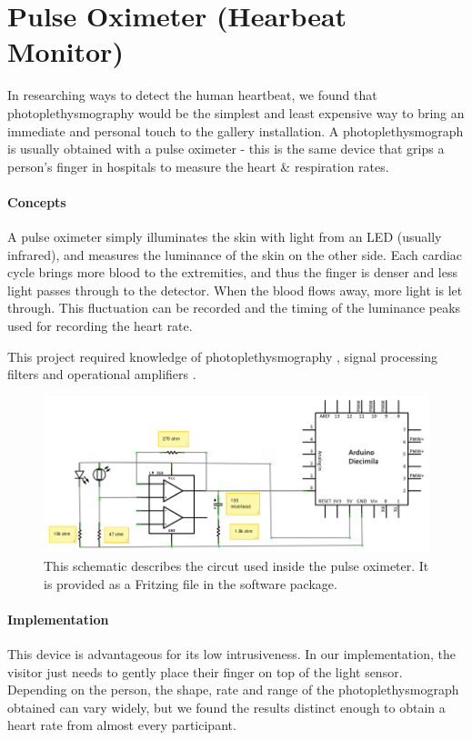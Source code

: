 \section{Pulse Oximeter (Hearbeat Monitor)}
In researching ways to detect the human heartbeat, we found that photoplethysmography would be the simplest and least expensive way to bring an immediate and personal touch to the gallery installation. A photoplethysmograph is usually obtained with a pulse oximeter - this is the same device that grips a person's finger in hospitals to measure the heart \& respiration rates. 

\paragraph{Concepts}
A pulse oximeter simply illuminates the skin with light from an LED (usually infrared), and measures the luminance of the skin on the other side. Each cardiac cycle brings more blood to the extremities, and thus the finger is denser and less light passes through to the detector. When the blood flows away, more light is let through. This fluctuation can be recorded and the timing of the luminance peaks used for recording the heart rate.

This project required knowledge of photoplethysmography \cite{PO} \cite{EC1}, signal processing filters \cite{EC2} and operational amplifiers \cite{HL} \cite{BK} \cite{BB}.

\begin{figure}[htp]\centering
  \includegraphics[width=.99\textwidth]{images/schematic-final.png}
  \caption{This schematic describes the circut used inside the pulse oximeter. It is provided as a Fritzing file in the software package.}\label{fig:poschem}
\end{figure}
\paragraph{Implementation}
This device is advantageous for its low intrusiveness. In our implementation, the visitor just needs to gently place their finger on top of the light sensor. Depending on the person, the shape, rate and range of the photoplethysmograph obtained can vary widely, but we found the results distinct enough to obtain a heart rate from almost every participant. 

